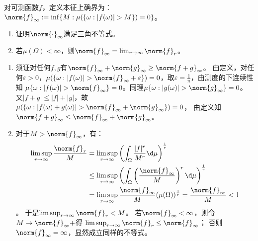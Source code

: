 \documentclass{ctexart}
\begin{document}
\begin{problem}\label{pro:3.6.30}
  对可测函数\(f \)，定义本征上确界为：
  \(\norm{f}_{\infty} := \inf \{M: \mu(\{\omega:|f(\omega) |>M\}) = 0\} \)。
  \begin{enumerate}
    \item 证明\(\norm{\cdot}_{\infty} \)满足三角不等式。
    \item 若\(\mu(\Omega)<\infty \)，则\(\norm{f}_{\infty}=\lim_{r \to \infty} \norm{f}_{r} \)。
  \end{enumerate}
\end{problem}
\begin{solution}
  \begin{enumerate}
    \item 须证对任何\(f,g \)有\(\norm{f}_{\infty} + \norm{g}_{\infty} \geq \norm{f + g}_{\infty} \)。
      由定义，对任何\(\varepsilon>0 \)，\(\mu(\{\omega:|f(\omega)|>\norm{f}_{\infty} + \varepsilon\})=0 \)，取\(\varepsilon=\frac{1}{n} \)，由测度的下连续性知
      \(\mu\{\omega:|f(\omega)|>\norm{f}_{\infty}\}=0 \)。同理\(\mu\{\omega:|g(\omega)|>\norm{g}_{\infty}\}=0 \)。
      又\(|f+g| \leq |f| + |g| \)，故\(\mu(\{\omega:|f(\omega) + g(\omega)|>\norm{f}_{\infty} + \norm{g}_{\infty}\})=0 \)，
      由定义知\(\norm{f + g}_{\infty} \leq \norm{f}_{\infty} + \norm{g}_{\infty} \)。
    \item 对于\(M>\norm{f}_{\infty} \)，有：
      \begin{equation}\label{equ:3}
        \begin{aligned}
          \limsup_{r \to \infty} \frac{\norm{f}_{r}}{M}&= \limsup_{r \to \infty} \left(\int_{\Omega} \frac{|f|^r}{M^r} \d \mu\right)^{  \frac{1}{r} }\\
          & \leq  \limsup_{r \to \infty} \left(\int_{\Omega} \left(\frac{\norm{f}_{\infty}}{M}\right)^r \d \mu \right)^{\frac{1}{r}}\\
          &= \limsup_{r \to \infty} \frac{\norm{f}_{\infty}}{M} (\mu(\Omega))^{\frac{1}{r}} = \frac{\norm{f}_{\infty}}{M} <1
        \end{aligned}
      \end{equation}。
      于是\(\limsup_{r \to \infty} \norm{f}_{r} < M \)。
      若\(\norm{f}_{\infty}<\infty \)，则令\(M \to \norm{f}_{\infty}+ \)得 \(\limsup_{r \to \infty} \norm{f}_{r} \leq \norm{f}_{\infty} \)；
      否则\(\norm{f}_{\infty}= \infty \)，显然成立同样的不等式。


\end{enumerate}
\end{solution}
\end{document}
